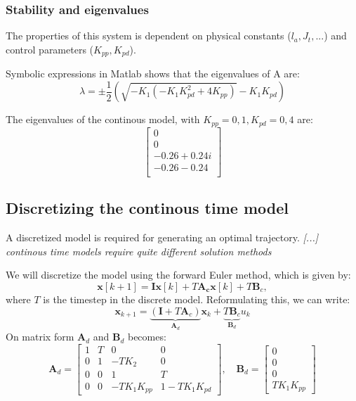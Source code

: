 \documentclass[../main.tex]{subfiles}
\begin{document}
\subsubsection{Stability and eigenvalues}
The properties of this system is dependent on physical constants ($l_a, J_t, ...$) and control parameters ($K_{pp}, K_{pd}$).

Symbolic expressions in Matlab shows that the eigenvalues of A are:
\begin{equation}
	\lambda = \pm \frac{1}{2} \left( \sqrt{-K_1 (-K_1 K_{pd}^2 + 4  K_{pp})} - K_1  K_{pd} \right)
\end{equation}

The eigenvalues of the continous model, with $K_{pp} = 0,1 , K_{pd} = 0,4$ are:
\begin{equation}\label{eq:lab2_ss_c_eigenvalues_example}
	\begin{bmatrix}
		0 \\ 0 \\ -0.26 + 0.24i \\ -0.26 - 0.24 \\
	\end{bmatrix}
\end{equation}

\subsection{Discretizing the continous time model}
A discretized model is required for generating an optimal trajectory. \textit{[...] continous time models require quite different solution methods} \cite{FossHeirung}

We will discretize the model using the forward Euler method, which is given by:
\begin{equation}\label{eq:lab2_forward_euler}
	\bm{x}[k + 1] = \bm I \bm x[k] + T\bm{A_c x}[k] + T\bm B_c ,
\end{equation}
where $ T $ is the timestep in the discrete model.
Reformulating this, we can write:
\begin{equation}\label{eq:lab2_discrete_system}
	\bm{x}_{k + 1} = \underbrace{(\bm I + T \bm A_c)}_{\bm A_d} \bm{x}_{k} + \underbrace{T \bm B_c}_{\bm B_d} u_k
\end{equation}
On matrix form $ \bm A_d $ and $ \bm B_d $ becomes: 
\begin{equation}
	\bm A_d = \begin{bmatrix}
		1 & T & 0 & 0 \\
		0 & 1 & -T K_2 & 0 \\
		0 & 0 & 1 & T \\
		0 & 0 & -T K_1 K_{pp} &  1 - T K_1 K_{pd}
	\end{bmatrix}, \quad 
	\bm B_d = \begin{bmatrix}
		0 \\ 0 \\ 0 \\T K_1 K_{pp}
	\end{bmatrix}
\end{equation}
\end{document}
